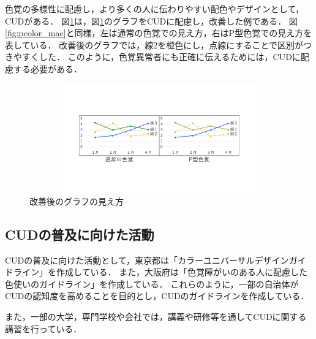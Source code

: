 色覚の多様性に配慮し，より多くの人に伝わりやすい配色やデザインとして，CUDがある．
図\ref{fig:pcolor_ato}は，図\ref{fig:pcolor_ato}のグラフをCUDに配慮し，改善した例である．
図\ref{fig:pcolor_mae}と同様，左は通常の色覚での見え方，右はP型色覚での見え方を表している．
改善後のグラフでは，線2を橙色にし，点線にすることで区別がつきやすくした．
このように，色覚異常者にも正確に伝えるためには，CUDに配慮する必要がある．

\begin{figure}[h]
\begin{center}
 \includegraphics[clip,width=159mm,height=47mm]{images/pcolor_ato.pdf}
\end{center}
 \caption{改善後のグラフの見え方}
 \label{fig:pcolor_ato}
\end{figure}

\subsection{CUDの普及に向けた活動}
CUDの普及に向けた活動として，東京都は「カラーユニバーサルデザインガイドライン」を作成している\cite{tokyo}．
また，大阪府は「色覚障がいのある人に配慮した色使いのガイドライン」を作成している\cite{osaka}．
これらのように，一部の自治体がCUDの認知度を高めることを目的とし，CUDのガイドラインを作成している．

また，一部の大学，専門学校や会社では，講義や研修等を通してCUDに関する講習を行っている．



